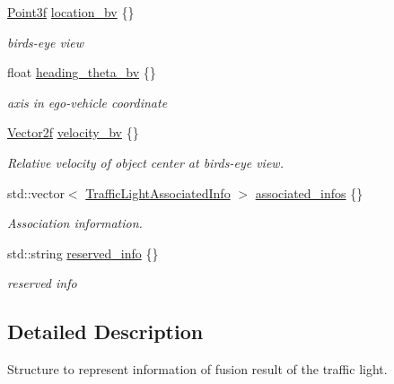 \begin{DoxyCompactItemize}
\hyperlink{structmaf__perception__interface_1_1Point3f}{Point3f} \hyperlink{structmaf__perception__interface_1_1TrafficLightMultiFrame_a7a64e241e206e931f2924cc98f9c129d}{location\+\_\+bv} \{\}
\begin{DoxyCompactList}\small\item\em bird\textquotesingle{}s-\/eye view \end{DoxyCompactList}\item 
float \hyperlink{structmaf__perception__interface_1_1TrafficLightMultiFrame_a5af1dbb8d8b6516e7c5c35c90d5c3cde}{heading\+\_\+theta\+\_\+bv} \{\}
\begin{DoxyCompactList}\small\item\em axis in ego-\/vehicle coordinate \end{DoxyCompactList}\item 
\hyperlink{structmaf__perception__interface_1_1Vector2f}{Vector2f} \hyperlink{structmaf__perception__interface_1_1TrafficLightMultiFrame_aa0943396383a07b9b0eeef26ebddd248}{velocity\+\_\+bv} \{\}
\begin{DoxyCompactList}\small\item\em Relative velocity of object center at bird\textquotesingle{}s-\/eye view. \end{DoxyCompactList}\item 
std\+::vector$<$ \hyperlink{structmaf__perception__interface_1_1TrafficLightAssociatedInfo}{Traffic\+Light\+Associated\+Info} $>$ \hyperlink{structmaf__perception__interface_1_1TrafficLightMultiFrame_a2d7983fb5a6d0e8a3d120f9cb646d7b6}{associated\+\_\+infos} \{\}
\begin{DoxyCompactList}\small\item\em Association information. \end{DoxyCompactList}\item 
std\+::string \hyperlink{structmaf__perception__interface_1_1TrafficLightMultiFrame_ae8e55acfd7433a911ede7004b109a4ad}{reserved\+\_\+info} \{\}
\begin{DoxyCompactList}\small\item\em reserved info \end{DoxyCompactList}\end{DoxyCompactItemize}


\subsection{Detailed Description}
Structure to represent information of fusion result of the traffic light. 

